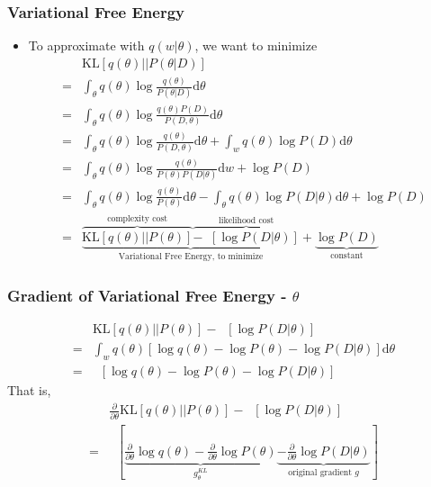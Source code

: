 \begin{frame}
  \frametitle{Variational Free Energy}
  \begin{itemize}
  \item To approximate with $q(w | \theta)$, we want to minimize
    \begin{align*}
       & \mathrm{KL}[q(\theta) || P(\theta | D)] \\
      =& \int_\theta q(\theta) \log \frac{q(\theta)}{P(\theta | D)} \mathrm{d} \theta \\
      =& \int_\theta q(\theta) \log \frac{q(\theta) P(D)}{P(D, \theta)} \mathrm{d} \theta \\
      =& \int_\theta q(\theta) \log \frac{q(\theta)}{P(D, \theta)} \mathrm{d} \theta +
      \int_w q(\theta) \log P(D) \mathrm{d} \theta\\
      =& \int_\theta q(\theta) \log \frac{q(\theta)}{P(\theta) P(D | \theta)} \mathrm{d} w + \log P(D) \\
      =& \int_\theta q(\theta) \log \frac{q(\theta)}{P(\theta)} \mathrm{d} \theta
         - \int_\theta q(\theta) \log P(D | \theta) \mathrm{d} \theta + \log P(D) \\
      =& \underbrace{
             \overbrace{\mathrm{KL}[q(\theta) || P(\theta)]}^{\text{complexity cost}}
             \overbrace{-\mathop{\mathbb{E}_{q(\theta)}}[\log P(D | \theta)]}^{\text{likelihood cost}}
         }_{\text{Variational Free Energy, to minimize}}
         + \underbrace{\log P(D)}_{\text{constant}}
    \end{align*}
  \end{itemize}
\end{frame}


\begin{frame}
  \frametitle{Gradient of Variational Free Energy - $\theta$}
  \begin{align*}
     & \mathrm{KL}[q(\theta) || P(\theta)] - \mathop{\mathbb{E}_{q(\theta)}}[\log P(D | \theta)] \\
    =& \int_w q(\theta) [\log q(\theta) - \log P(\theta) - \log P(D | \theta)] \mathrm{d} \theta \\
    =& \mathop{\mathbb{E}_\theta }[\log q(\theta) - \log P(\theta) - \log P(D | \theta)]
  \end{align*}
  That is,
  \begin{align*}
     & \frac{\partial}{\partial \theta} \mathrm{KL}[q(\theta) || P(\theta)] - \mathop{\mathbb{E}_{q(\theta)}}[\log P(D | \theta)] \\
    =& \mathop{\mathbb{E}_\epsilon }
       [\underbrace{\frac{\partial}{\partial \theta} \log q(\theta)
       - \frac{\partial}{\partial \theta} \log P(\theta)}_{g^{KL}_\theta}
       \underbrace{- \frac{\partial}{\partial \theta} \log P(D | \theta)}_{\text{original gradient $g$}}]
  \end{align*}
  
\end{frame}